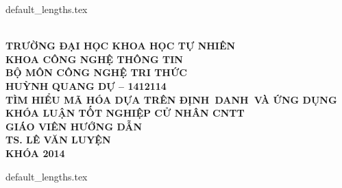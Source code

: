 \documentclass[class=report, crop=false]{standalone}
\begin{document}
	{default_lengths.tex}
	\linespread{1}
	\hypertarget{titlepage}{}
	\begin{titlepage}
		\thisfancypage{%
		\fbox}{}
		
		\begin{center}
			\leavevmode \\[\baselineskip]
			\sffamily\fontsize{13pt}{24pt}\selectfont\bfseries
			TRƯỜNG ĐẠI HỌC KHOA HỌC TỰ NHIÊN \\
			KHOA CÔNG NGHỆ THÔNG TIN \\
			BỘ MÔN CÔNG NGHỆ TRI THỨC \\[2.5cm]
			\rmfamily\large
			HUỲNH QUANG DỰ -- 1412114 \\[2.5cm]
			\sffamily\fontsize{20pt}{30pt}\selectfont
			TÌM HIỂU MÃ HÓA DỰA TRÊN ĐỊNH~DANH~VÀ ỨNG DỤNG \\[1.5cm]
			\rmfamily\large
			KHÓA LUẬN TỐT NGHIỆP CỬ NHÂN CNTT \\[1.7cm]
			GIÁO VIÊN HƯỚNG DẪN \\[\baselineskip]
			\sffamily\fontsize{13pt}{16.8pt}\selectfont
			TS. LÊ VĂN LUYỆN \\[5cm]
			KHÓA 2014
		\end{center}
	\end{titlepage}
	{default_lengths.tex}
\end{document}

